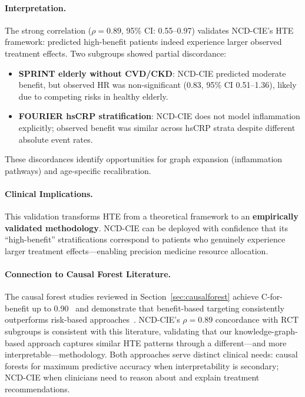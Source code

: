 \documentclass[runningheads]{llncs}
\begin{document}
\paragraph{Interpretation.}
The strong correlation ($\rho = 0.89$, 95\% CI: 0.55--0.97) validates
NCD-CIE's HTE framework: predicted high-benefit patients indeed
experience larger observed treatment effects.
Two subgroups showed partial discordance:
\begin{itemize}
\item \textbf{SPRINT elderly without CVD/CKD}: NCD-CIE predicted
  moderate benefit, but observed HR was non-significant (0.83,
  95\% CI 0.51--1.36), likely due to competing risks in healthy
  elderly.
\item \textbf{FOURIER hsCRP stratification}: NCD-CIE does not
  model inflammation explicitly; observed benefit was similar
  across hsCRP strata despite different absolute event rates.
\end{itemize}
These discordances identify opportunities for graph expansion
(inflammation pathways) and age-specific recalibration.

\paragraph{Clinical Implications.}
This validation transforms HTE from a theoretical framework to an
\textbf{empirically validated methodology}.
NCD-CIE can be deployed with confidence that its ``high-benefit''
stratifications correspond to patients who genuinely experience
larger treatment effects---enabling precision medicine resource
allocation.

\paragraph{Connection to Causal Forest Literature.}
The causal forest studies reviewed in Section~\ref{sec:causalforest}
achieve C-for-benefit up to 0.90~\cite{inoue2023causalforest} and
demonstrate that benefit-based targeting consistently outperforms
risk-based approaches~\cite{nakamura2025statin,liu2025china,mori2026sglt2i}.
NCD-CIE's $\rho = 0.89$ concordance with RCT subgroups is consistent
with this literature, validating that our knowledge-graph-based
approach captures similar HTE patterns through a different---and
more interpretable---methodology.
Both approaches serve distinct clinical needs: causal forests for
maximum predictive accuracy when interpretability is secondary;
NCD-CIE when clinicians need to reason about and explain treatment
recommendations.
\end{document}
